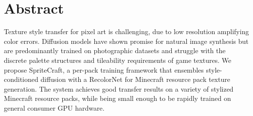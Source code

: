 \chapter*{Abstract}

Texture style transfer for pixel art is challenging, due to low resolution amplifying color errors. Diffusion models have shown promise for natural image synthesis but are predominantly trained on photographic datasets and struggle with the discrete palette structures and tileability requirements of game textures. We propose SpriteCraft, a per-pack training framework that ensembles style-conditioned diffusion with a RecolorNet for Minecraft resource pack texture generation. The system achieves good transfer results on a variety of stylized Minecraft resource packs, while being small enough to be rapidly trained on general consumer GPU hardware.
\clearpage
